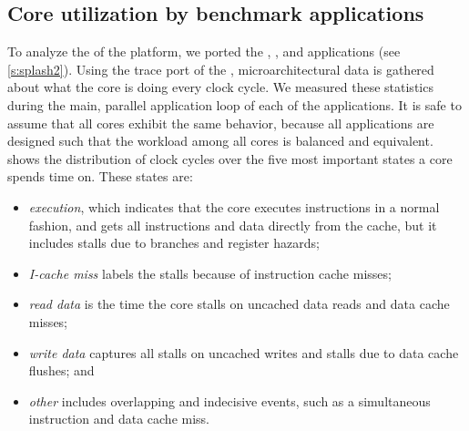 \subsection{Core utilization by benchmark applications}

\label{s:hardware:ae:utilization}

To analyze the  of the platform, we ported the \SPLASH* {}, , and  applications (see \cref{s:splash2}).
Using the trace port of the \MicroBlaze, microarchitectural data is gathered about what the core is doing every clock cycle.
We measured these statistics during the main, parallel application loop of each of the applications.
It is safe to assume that all cores exhibit the same behavior, because all applications are designed such that the workload among all cores is balanced and equivalent.
 shows the distribution of clock cycles over the five most important states a core spends time on.
These states are:
\begin{itemize}
\item \emph{execution}, which indicates that the core executes instructions in a normal fashion, and gets all instructions and data directly from the cache, but it includes stalls due to branches and register hazards;
\item \emph{I-cache miss} labels the stalls because of instruction cache misses;
\item \emph{read data} is the time the core stalls on uncached data reads and data cache misses;
\item \emph{write data} captures all stalls on uncached writes and stalls due to data cache flushes; and
\item \emph{other} includes overlapping and indecisive events, such as a simultaneous instruction and data cache miss.
\end{itemize}


\label{s:hardware:ae:latency_problem}

